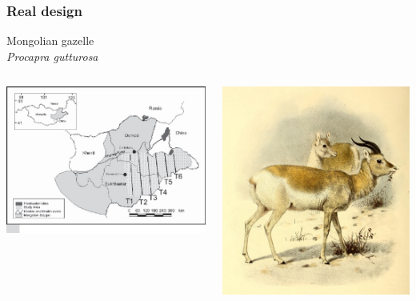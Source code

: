 \documentclass[color=usenames,dvipsnames,handout]{beamer}\usepackage[]{graphicx}\usepackage[]{xcolor}
\begin{document}
\begin{frame}
  \frametitle{Real design}
  \centering
  \large
  Mongolian gazelle \\
  {\it Procapra gutturosa} \\
  \vfill
  \begin{columns}
    \begin{column}{0.6\textwidth}
      \includegraphics[width=\textwidth]{figs/Kirk}
    \end{column}
    \begin{column}{0.4\textwidth}
      \includegraphics[width=\textwidth]{figs/Book_of_antelopes_(1894)_Gazella_gutturosa}
    \end{column}
  \end{columns}
\end{frame}
\end{document}
